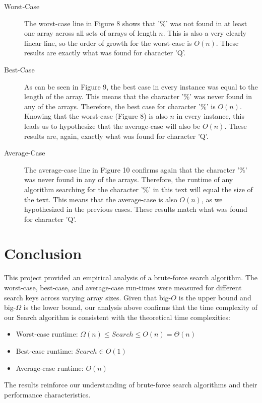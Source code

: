 \documentclass{article}
\begin{document}
\begin{description}
    \item[Worst-Case] The worst-case line in Figure 8 shows that '\%' was not found in at least one array across all sets of arrays of length $n$. This is also a very clearly linear line, so the order of growth for the worst-case is $O(n)$. These results are exactly what was found for character 'Q'. 
    \item[Best-Case] As can be seen in Figure 9, the best case in every instance was equal to the length of the array. This means that the character '\%' was never found in any of the arrays. Therefore, the best case for character '\%' is $O(n)$. Knowing that the worst-case (Figure 8) is also $n$ in every instance, this leads us to hypothesize that the average-case will also be $O(n)$. These results are, again, exactly what was found for character 'Q'.
    \item[Average-Case] The average-case line in Figure 10 confirms again that the character '\%' was never found in any of the arrays. Therefore, the runtime of any algorithm searching for the character '\%' in this text will equal the size of the text. This means that the average-case is also $O(n)$, as we hypothesized in the previous cases. These results match what was found for character 'Q'. 
\end{description}

\section{Conclusion}
This project provided an empirical analysis of a brute-force search algorithm. The worst-case, best-case, and average-case run-times were measured for different search keys across varying array sizes. Given that big-$O$ is the upper bound and big-$\Omega$ is the lower bound, our analysis above confirms that the time complexity of our Search algorithm is consistent with the theoretical time complexities:
	
    \begin{itemize}
        \item Worst-case runtime: \( \Omega(n) \leq Search \leq O(n) = \Theta(n) \)
	\item Best-case runtime: \( Search \in O(1) \)
	\item Average-case runtime: \( O(n) \)
    \end{itemize}
    
The results reinforce our understanding of brute-force search algorithms and their performance characteristics.
\end{document}

